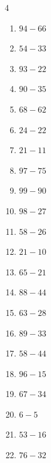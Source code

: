 \begin{multicols}{4}
\begin{enumerate}
  \item $94-66$
        \phantom{$=28$}

  \item $54-33$
        \phantom{$=21$}

  \item $93-22$
        \phantom{$=71$}

  \item $90-35$
        \phantom{$=55$}

  \item $68-62$
        \phantom{$=6$}

  \item $24-22$
        \phantom{$=2$}

  \item $21-11$
        \phantom{$=10$}

  \item $97-75$
        \phantom{$=22$}

  \item $99-90$
        \phantom{$=9$}

  \item $98-27$
        \phantom{$=71$}

  \item $58-26$
        \phantom{$=32$}

  \item $21-10$
        \phantom{$=11$}

  \item $65-21$
        \phantom{$=44$}

  \item $88-44$
        \phantom{$=44$}

  \item $63-28$
        \phantom{$=35$}

  \item $89-33$
        \phantom{$=56$}

  \item $58-44$
        \phantom{$=14$}

  \item $96-15$
        \phantom{$=81$}

  \item $67-34$
        \phantom{$=33$}

\columnbreak %

  \item $6-5$
        \phantom{$=1$}

  \item $53-16$
        \phantom{$=37$}

  \item $76-32$
        \phantom{$=44$}


\end{enumerate}
\end{multicols}
